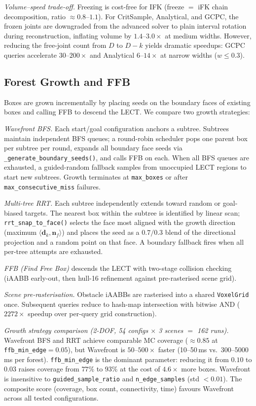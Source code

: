\documentclass[journal]{IEEEtran}
\begin{document}
\emph{Volume--speed trade-off.}
Freezing is cost-free for IFK (freeze $=$ iFK chain decomposition,
ratio $\approx 0.8$--$1.1$).
For CritSample, Analytical, and GCPC, the frozen joints are
downgraded from the advanced solver to plain interval rotation
during reconstruction, inflating volume by $1.4$--$3.0{\times}$
at medium widths.
However, reducing the free-joint count from $D$ to $D{-}k$
yields dramatic speedups: GCPC queries accelerate
$30$--$200{\times}$ and Analytical $6$--$14{\times}$ at narrow
widths ($w \leq 0.3$).

\subsection{Forest Growth and FFB}\label{sec:forest_growth}

Boxes are grown incrementally by placing seeds on the boundary
faces of existing boxes and calling FFB to descend the LECT.
We compare two growth strategies:

\emph{Wavefront BFS.}
Each start/goal configuration anchors a subtree.
Subtrees maintain independent BFS queues; a round-robin scheduler
pops one parent box per subtree per round, expands all boundary
face seeds via \texttt{\_generate\_boundary\_seeds()}, and calls
FFB on each.
When all BFS queues are exhausted, a guided-random fallback
samples from unoccupied LECT regions to start new subtrees.
Growth terminates at \texttt{max\_boxes} or after
\texttt{max\_consecutive\_miss} failures.

\emph{Multi-tree RRT.}
Each subtree independently extends toward random
or goal-biased targets.
The nearest box within the subtree is identified by linear scan;
\texttt{rrt\_snap\_to\_face()} selects the face most aligned with
the growth direction (maximum $\langle \mathbf{d}_k, \mathbf{n}_f \rangle$)
and places the seed as a $0.7/0.3$ blend of the directional
projection and a random point on that face.
A boundary fallback fires when all per-tree attempts are
exhausted.

\emph{FFB (Find Free Box)} descends the LECT with two-stage collision
checking (iAABB early-out, then hull-16 refinement against
pre-rasterised scene grid).

\emph{Scene pre-rasterisation.}
Obstacle iAABBs are rasterised into a shared \texttt{VoxelGrid} once.
Subsequent queries reduce to hash-map intersection with bitwise AND
($2272{\times}$ speedup over per-query grid construction).

\emph{Growth strategy comparison (2-DOF, 54 configs $\times$ 3 scenes
$=$ 162 runs).}
Wavefront BFS and RRT achieve comparable MC coverage
($\approx 0.85$ at \texttt{ffb\_min\_edge}${}=0.05$),
but Wavefront is $50$--$500{\times}$ faster
(10--50\,ms vs.\ 300--5000\,ms per forest).
\texttt{ffb\_min\_edge} is the dominant parameter:
reducing it from $0.10$ to $0.03$ raises coverage from $77\%$
to $93\%$ at the cost of $4.6{\times}$ more boxes.
Wavefront is insensitive to \texttt{guided\_sample\_ratio}
and \texttt{n\_edge\_samples} (std $< 0.01$).
The composite score (coverage, box count, connectivity, time)
favours Wavefront across all tested configurations.
\end{document}
